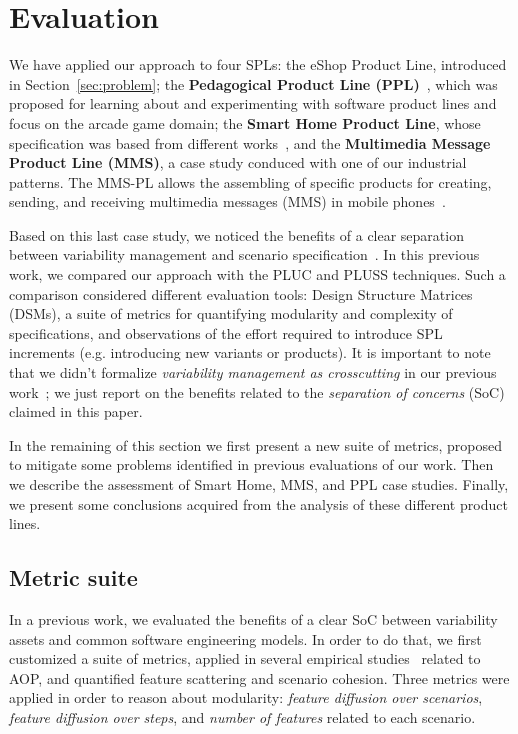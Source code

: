 \section{Evaluation}
\label{sec:evaluation}

We have applied our approach to four SPLs: the eShop Product Line, introduced in
Section~\ref{sec:problem}; the {\bf Pedagogical Product Line
(PPL)}~\cite{PPL:2008}, which was proposed for learning about and experimenting
with software product lines and focus on the arcade game domain; the {\bf Smart
Home Product Line}, whose specification was based from different
works~\cite{Pohl:2005aa,Alferez:2008aa}, and the {\bf Multimedia Message Product
Line (MMS)}, a case study conduced with one of our industrial patterns. The
MMS-PL allows the assembling of specific products for creating, sending, and
receiving multimedia messages (MMS) in mobile phones~\cite{Bonifacio:2008aa}.


Based on this last case study, we noticed the benefits of a clear separation
between variability management and scenario
specification~\cite{Bonifacio:2008aa}. In this previous work, we compared our
approach with the PLUC and PLUSS techniques. Such a comparison considered
different evaluation tools: Design Structure Matrices (DSMs), a suite of metrics
for quantifying modularity and complexity of specifications, and observations of
the effort required to introduce SPL increments (e.g. introducing new variants or
products). It is important to note that we didn't formalize \emph{variability
management as crosscutting} in our previous work~\cite{Bonifacio:2008aa}; we just
report on the benefits related to the \emph{separation of concerns} (SoC) claimed
in this paper.

In the remaining of this section we first present a new suite of metrics,
proposed to mitigate some problems identified in previous evaluations of our
work. Then we describe the assessment of Smart Home,
MMS, and PPL case studies. Finally, we present some conclusions acquired from
the analysis of these different product lines.

\subsection{Metric suite}\label{sub:metric-suite}

In a previous work, we evaluated the benefits of a clear SoC between variability
assets and common software engineering models. In order to do that, we first
customized a suite of metrics, applied in several empirical
studies~\cite{Garcia:2005aa,Greenwood:2007aa,Figueiredo:2008ab,Figueiredo:2008ab}
related to AOP, and quantified feature scattering and scenario cohesion. Three
metrics were applied in order to reason about modularity: \emph{feature diffusion
over scenarios}, \emph{feature diffusion over steps}, and \emph{number of
features} related to each scenario.

